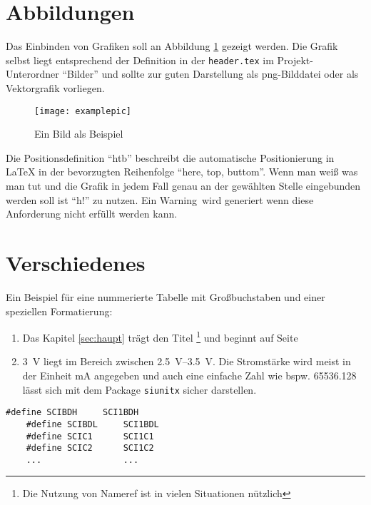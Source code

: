 \section{Abbildungen}
\label{sec:haupt:figure}

Das Einbinden von Grafiken soll an Abbildung \ref{fig:beispiel} gezeigt werden. Die Grafik selbst liegt entsprechend der Definition in der \texttt{header.tex} im Projekt-Unterordner "`Bilder"' und sollte zur guten Darstellung als png-Bilddatei oder als Vektorgrafik vorliegen.

\begin{figure}[htb]
\begin{center} 
  \texttt{[image: examplepic]}  
  \caption{Ein Bild als Beispiel}
  \label{fig:beispiel}
\end{center}
\end{figure}
 
Die Positionsdefinition "`htb"' beschreibt die automatische Positionierung in LaTeX in der bevorzugten Reihenfolge "`here, top, buttom"'. Wenn man weiß was man tut und die Grafik in jedem Fall genau an der gewählten Stelle eingebunden werden soll ist "`h!"' zu nutzen. Ein Warning\ wird generiert wenn diese Anforderung nicht erfüllt werden kann.
 
\section{Verschiedenes}
\label{sec:haupt:misc}

Ein Beispiel für eine nummerierte Tabelle mit Großbuchstaben und einer speziellen Formatierung:
\begin{enumerate}[\bfseries (A) {-}]
  \item Das Kapitel \ref{sec:haupt} trägt den Titel \footnote{Die Nutzung von Nameref ist in vielen Situationen nützlich} und beginnt auf Seite \pageref{sec:haupt} 
  \item \SI{3}{\volt} liegt im Bereich zwischen \SIrange[range-units=single]{2,5}{3,5}{\volt}. Die Stromstärke wird meist in der Einheit \si{\mA} angegeben und auch eine einfache Zahl wie bspw. \num{65536,128} lässt sich mit dem Package \texttt{siunitx} sicher darstellen.
     
\end{enumerate}


\begin{lstlisting}[caption={\texttt{SCI.c} - SCI-Definitionen}, label=lst:scidefine]
	#define SCIBDH     SCI1BDH
	#define SCIBDL     SCI1BDL
	#define SCIC1      SCI1C1
	#define SCIC2      SCI1C2
	...                ...
\end{lstlisting}

